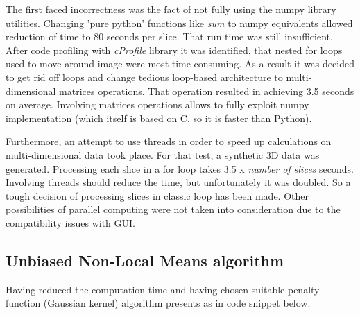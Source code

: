 The first faced incorrectness was the fact of not fully using the numpy library utilities. Changing 'pure python' functions like \textit{sum} to numpy equivalents allowed reduction of time to 80 seconds per slice. That run time was still insufficient. After code profiling with \textit{cProfile} library it was identified, that nested for loops used to move around image were most time consuming. As a result it was decided to get rid off loops and change tedious loop-based architecture to multi-dimensional matrices operations. That operation resulted in achieving 3.5 seconds on average. Involving matrices operations allows to fully exploit numpy implementation (which itself is based on C, so it is faster than Python).

Furthermore, an attempt to use threads in order to speed up calculations on multi-dimensional data took place. For that test, a synthetic 3D data was generated. Processing each slice in a for loop takes 3.5 x \textit{number of slices} seconds. Involving threads should reduce the time, but unfortunately it was doubled. So a tough decision of processing slices in classic loop has been made. Other possibilities of parallel computing were not taken into consideration due to the compatibility issues with GUI.

\subsection*{Unbiased Non-Local Means algorithm}
Having reduced the computation time and having chosen suitable penalty function (Gaussian kernel) algorithm presents as in code snippet below.

